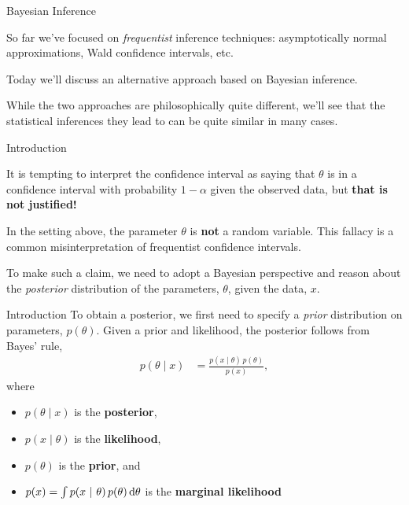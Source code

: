 \documentclass[aspectratio=169]{beamer}
\begin{document}
\begin{frame}[t,allowframebreaks]{Bayesian Inference}\label{bayesian-inference}

So far we've focused on \emph{frequentist} inference techniques:
asymptotically normal approximations, Wald confidence intervals, etc.

Today we'll discuss an alternative approach based on Bayesian inference.

While the two approaches are philosophically quite different, we'll see
that the statistical inferences they lead to can be quite similar in
many cases.
\end{frame}

\begin{frame}[t,allowframebreaks]{Introduction}\label{introduction}

It is tempting to interpret the confidence interval as saying that
\(\theta\) is in a confidence interval with probability \(1-\alpha\)
given the observed data, but \textbf{that is not justified!} 

In the setting above, the parameter \(\theta\) is \textbf{not} a random
variable. This fallacy is a common misinterpretation of frequentist
confidence intervals.

To make such a claim, we need to adopt a Bayesian perspective and reason
about the \emph{posterior} distribution of the parameters, \(\theta\),
given the data, \(x\). 
\end{frame}

\begin{frame}[t,allowframebreaks]{Introduction}\label{introduction}
To obtain a posterior, we first need to specify a
\emph{prior} distribution on parameters, \(p(\theta)\). Given a prior
and likelihood, the posterior follows from Bayes' rule, \begin{align*}
p(\theta \mid x) &= \frac{p(x \mid \theta) \, p(\theta)}{p(x)},
\end{align*} 
where 
\begin{itemize}
    \item \(p(\theta \mid x)\) is the \textbf{posterior}, 
    \item \(p(x \mid \theta)\) is the \textbf{likelihood}, 
    \item \(p(\theta)\) is the \textbf{prior}, and 
    \item \(p(x) = \int p(x ~\vert~ \theta) \, p(\theta) \mathop{}\!\mathrm{d} \theta\) is the
\textbf{marginal likelihood}
\end{itemize}
\end{frame}
\end{document}

